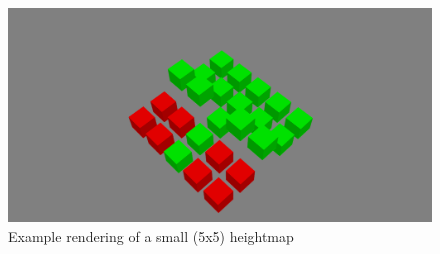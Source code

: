 \documentclass[a4paper]{article}
\begin{document}
    \begin{figure}[!h]
        \centering
        \includegraphics[width=\textwidth]{images/demo_render.png}
        \caption{Example rendering of a small (5x5) heightmap}
    \end{figure}
\end{document}
